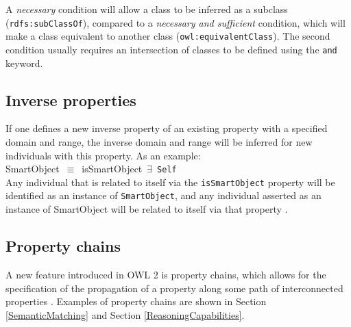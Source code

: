 A \emph{necessary} condition will allow a class to be inferred as a subclass (\texttt{rdfs:subClassOf}), compared to a \emph{necessary and sufficient} condition, which will make a class equivalent to another class (\texttt{owl:equivalent\-Class}). The second condition usually requires an intersection of classes to be defined using the \texttt{and} keyword.


\subsection{Inverse properties}

If one defines a new inverse property of an existing property with a specified domain and range, the inverse domain and range will be inferred for new individuals with this property.  As an example:\\

\noindent
SmartObject~\ensuremath{\equiv}~isSmartObject~\ensuremath{\exists}~\texttt{Self}\\


Any individual that is related to itself via the \texttt{isSmartObject} property will be identified as an instance of \texttt{SmartObject}, and any individual asserted as an instance of SmartObject will be related to itself via that property \cite{Hoekstra2010}.


\subsection{Property chains}

A new feature introduced in \ac{OWL} 2 is property chains, which allows for the specification of the propagation of a property along some path of interconnected properties \cite{Hoekstra2008}. Examples of property chains are shown in Section \ref{SemanticMatching} and Section \ref{ReasoningCapabilities}.


